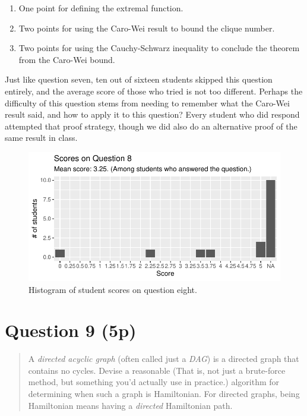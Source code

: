 \documentclass[nobib]{tufte-handout}
\begin{document}
\begin{enumerate}
  \item One point for defining the extremal function.
  \item Two points for using the Caro-Wei result to bound the clique number.
  \item Two points for using the Cauchy-Schwarz inequality to conclude the theorem from the Caro-Wei bound.
\end{enumerate}

Just like question seven, ten out of sixteen students skipped this question entirely, and the average score of those who tried is not too different. Perhaps the difficulty of this question stems from needing to remember what the Caro-Wei result said, and how to apply it to this question? Every student who did respond attempted that proof strategy, though we did also do an alternative proof of the same result in class.

\begin{figure}[p]
  \centering
  \includegraphics[width = \textwidth]{Q8.pdf}
  \caption[Score histogram for Q8]{Histogram of student scores on question eight.}
  \label{fig:Q8}
\end{figure}

\section{Question 9 (5p)} %

\begin{quotation}
  A \emph{directed acyclic graph} (often called just a \emph{DAG}) is a directed graph that contains no cycles. Devise a reasonable (That is, not just a brute-force method, but something you'd actually use in practice.) algorithm for determining when such a graph is Hamiltonian. For directed graphs, being Hamiltonian means having a \emph{directed} Hamiltonian path.
\end{quotation}
\end{document}
